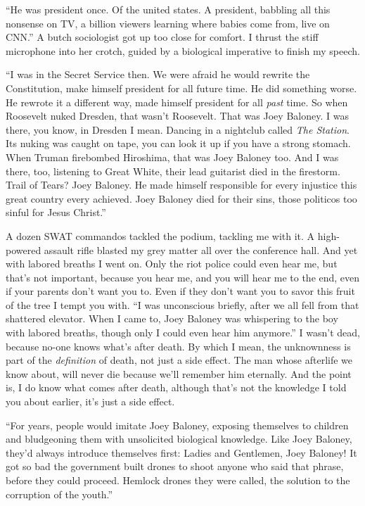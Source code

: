 \documentclass{memoir}
\begin{document}
``He was president once.  Of the united states.  A president, babbling all this nonsense on
TV, a billion viewers learning where babies come from, live on CNN.''  A butch sociologist got
up too close for comfort.  I thrust the stiff microphone into her crotch, guided by a biological
imperative to finish my speech.

``I was in the Secret Service then.  We were afraid he would
rewrite the Constitution, make himself president for all future time.  He did something worse.
He rewrote it a different way, made himself president for all \emph{past} time.  So when Roosevelt
nuked Dresden, that wasn't Roosevelt.  That was Joey Baloney.  I was there, you know, in Dresden
I mean.  Dancing in a nightclub called \emph{The Station}.  Its nuking was caught on tape, you can
look it up if you have a strong stomach.  When Truman firebombed Hiroshima, that was Joey
Baloney too.  And I was there, too, listening to Great White, their lead guitarist
died in the firestorm.  Trail of Tears?  Joey Baloney.  He made himself responsible for
every injustice this great country every achieved.  Joey Baloney died for their sins, those politicos
too sinful for Jesus Christ.''

A dozen SWAT commandos tackled the podium, tackling me with it.
A high-powered assault rifle blasted my grey matter all over the conference hall.
And yet with labored breaths I went on.
Only the riot police could even hear me, but
that's not important, because you hear me, and you will hear me to the end, even if your parents
don't want you to.  Even if they don't want you to savor this fruit of the tree I tempt you with.
``I was unconscious briefly, after we all fell from that shattered elevator.  When I came to, Joey Baloney
was whispering to the boy with labored breaths, though only I could even hear him anymore.''  I wasn't dead, because
no-one knows what's after death.  By which I mean, the unknownness is part of the \emph{definition} of death,
not just a side effect.  The man whose afterlife we know about, will never die because we'll remember him
eternally.  And the point is, I do know what comes after death, although that's not the knowledge I told you about earlier,
it's just a side effect.

``For years, people would imitate Joey Baloney, exposing themselves to children and bludgeoning them with
unsolicited biological knowledge.  Like Joey Baloney, they'd always introduce themselves first: Ladies and Gentlemen,
Joey Baloney!  It got so bad the government built drones to shoot anyone who said that phrase, before they could
proceed.  Hemlock drones they were called, the solution to the corruption of the youth.''
\end{document}
